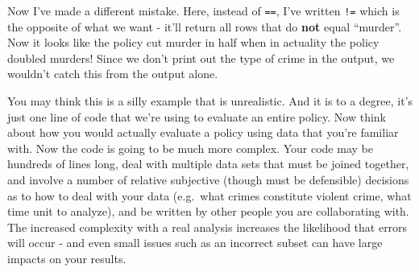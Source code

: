 \documentclass[
]{krantz}
\makeatletter
\newenvironment{Shaded}{\begin{snugshade}}{\end{snugshade}}
\newcommand{\CommentTok}[1]{\textcolor[rgb]{0.37,0.37,0.37}{\textit{#1}}}
\newcommand{\FunctionTok}[1]{\textcolor[rgb]{0,0,0}{#1}}
\newcommand{\NormalTok}[1]{#1}
\newcommand{\OtherTok}[1]{\textcolor[rgb]{0.37,0.37,0.37}{#1}}
\newcommand{\SpecialCharTok}[1]{\textcolor[rgb]{0,0,0}{#1}}
\newcommand{\StringTok}[1]{\textcolor[rgb]{0.5,0.5,0.5}{#1}}
\newenvironment{kframe}{%
\medskip{}
\setlength{\fboxsep}{.8em}
 \def\at@end@of@kframe{}%
 \ifinner\ifhmode%
  \def\at@end@of@kframe{\end{minipage}}%
  \begin{minipage}{\columnwidth}%
 \fi\fi%
 \def\FrameCommand##1{\hskip\@totalleftmargin \hskip-\fboxsep
 \colorbox{shadecolor}{##1}\hskip-\fboxsep
     \hskip-\linewidth \hskip-\@totalleftmargin \hskip\columnwidth}%
 \MakeFramed {\advance\hsize-\width
   \@totalleftmargin\z@ \linewidth\hsize
   \@setminipage}}%
 {\par\unskip\endMakeFramed%
 \at@end@of@kframe}
\renewenvironment{Shaded}{\begin{kframe}}{\end{kframe}}
\makeatother
\begin{document}
\begin{Shaded}
\begin{Highlighting}[]
\NormalTok{example\_data[example\_data}\SpecialCharTok{$}\NormalTok{crime\_type }\OtherTok{=} \StringTok{"murder"}\NormalTok{, }\FunctionTok{c}\NormalTok{(}\StringTok{"year"}\NormalTok{, }\StringTok{"crime\_count"}\NormalTok{)]}
\CommentTok{\#\textgreater{} Error: \textless{}text\textgreater{}:1:38: unexpected \textquotesingle{}=\textquotesingle{}}
\CommentTok{\#\textgreater{} 1: example\_data[example\_data$crime\_type =}
\CommentTok{\#\textgreater{}                                          \^{}}
\end{Highlighting}
\end{Shaded}

Now I've made a different mistake. Here, instead of \texttt{==}, I've written \texttt{!=} which is the opposite of what we want - it'll return all rows that do \textbf{not} equal ``murder''. Now it looks like the policy cut murder in half when in actuality the policy doubled murders! Since we don't print out the type of crime in the output, we wouldn't catch this from the output alone.

\begin{Shaded}
\end{Shaded}

You may think this is a silly example that is unrealistic. And it is to a degree, it's just one line of code that we're using to evaluate an entire policy. Now think about how you would actually evaluate a policy using data that you're familiar with. Now the code is going to be much more complex. Your code may be hundreds of lines long, deal with multiple data sets that must be joined together, and involve a number of relative subjective (though must be defensible) decisions as to how to deal with your data (e.g.~what crimes constitute violent crime, what time unit to analyze), and be written by other people you are collaborating with. The increased complexity with a real analysis increases the likelihood that errors will occur - and even small issues such as an incorrect subset can have large impacts on your results.
\end{document}
